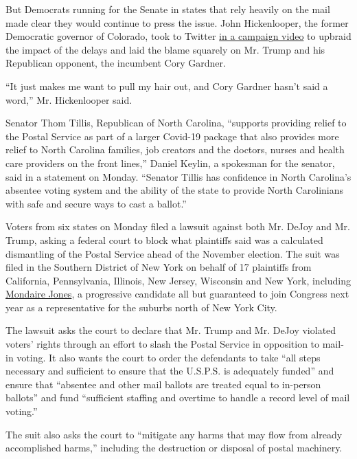 But Democrats running for the Senate in states that rely heavily on the
mail made clear they would continue to press the issue. John
Hickenlooper, the former Democratic governor of Colorado, took to
Twitter
\href{https://twitter.com/Hickenlooper/status/1295102236574408704?s=20}{in
a campaign video} to upbraid the impact of the delays and laid the blame
squarely on Mr. Trump and his Republican opponent, the incumbent Cory
Gardner.

``It just makes me want to pull my hair out, and Cory Gardner hasn't
said a word,'' Mr. Hickenlooper said.

Senator Thom Tillis, Republican of North Carolina, ``supports providing
relief to the Postal Service as part of a larger Covid-19 package that
also provides more relief to North Carolina families, job creators and
the doctors, nurses and health care providers on the front lines,''
Daniel Keylin, a spokesman for the senator, said in a statement on
Monday. ``Senator Tillis has confidence in North Carolina's absentee
voting system and the ability of the state to provide North Carolinians
with safe and secure ways to cast a ballot.''

Voters from six states on Monday filed a lawsuit against both Mr. DeJoy
and Mr. Trump, asking a federal court to block what plaintiffs said was
a calculated dismantling of the Postal Service ahead of the November
election. The suit was filed in the Southern District of New York on
behalf of 17 plaintiffs from California, Pennsylvania, Illinois, New
Jersey, Wisconsin and New York, including
\href{https://www.nytimes3xbfgragh.onion/2020/07/14/nyregion/mondaire-jones-house-primary.html}{Mondaire
Jones}, a progressive candidate all but guaranteed to join Congress next
year as a representative for the suburbs north of New York City.

The lawsuit asks the court to declare that Mr. Trump and Mr. DeJoy
violated voters' rights through an effort to slash the Postal Service in
opposition to mail-in voting. It also wants the court to order the
defendants to take ``all steps necessary and sufficient to ensure that
the U.S.P.S. is adequately funded'' and ensure that ``absentee and other
mail ballots are treated equal to in-person ballots'' and fund
``sufficient staffing and overtime to handle a record level of mail
voting.''

The suit also asks the court to ``mitigate any harms that may flow from
already accomplished harms,'' including the destruction or disposal of
postal machinery.

